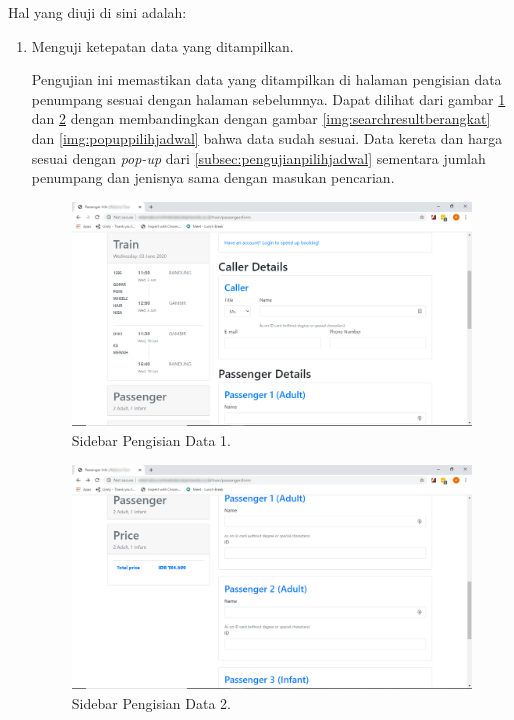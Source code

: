 Hal yang diuji di sini adalah:
    \begin{enumerate}
        \item Menguji ketepatan data yang ditampilkan.
        
        Pengujian ini memastikan data yang ditampilkan di halaman pengisian data penumpang sesuai dengan halaman sebelumnya. Dapat dilihat dari gambar \ref{img:sidebarisidata1} dan \ref{img:sidebarisidata2} dengan membandingkan dengan gambar \ref{img:searchresultberangkat} dan \ref{img:popuppilihjadwal} bahwa data sudah sesuai. Data kereta dan harga sesuai dengan \textit{pop-up} dari \ref{subsec:pengujianpilihjadwal} sementara jumlah penumpang dan jenisnya sama dengan masukan pencarian.
        
        \begin{figure}[H]
        \center
        \includegraphics[width=\textwidth,height=\textheight,keepaspectratio]{Gambar/Sidebar isi data 1.png}
        \caption{Sidebar Pengisian Data 1.}
            \label{img:sidebarisidata1}
        \end{figure}
        
        \begin{figure}[H]
        \center
        \includegraphics[width=\textwidth,height=\textheight,keepaspectratio]{Gambar/Sidebar isi data 2.png}
        \caption{Sidebar Pengisian Data 2.}
            \label{img:sidebarisidata2}
        \end{figure}
        

\end{enumerate}
